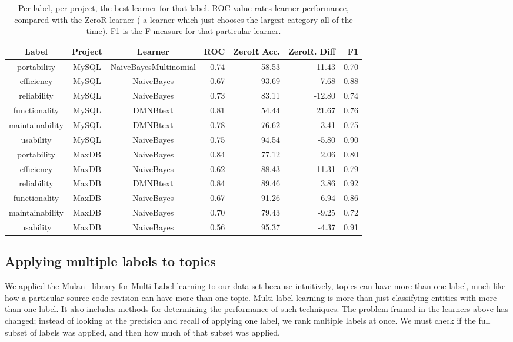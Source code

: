 \documentclass{acm_proc_article-sp}
\begin{document}
\begin{table}
\centering
\begin{tabular}{ccc|rrrr}
\toprule
Label & Project & Learner & ROC & ZeroR Acc. & ZeroR. Diff & F1\\
\midrule
portability &  MySQL &  NaiveBayesMultinomial &  0.74 &  58.53 &  11.43 &  0.70  \\ 
efficiency &  MySQL &  NaiveBayes &  0.67 &  93.69 &  -7.68 &  0.88 \\ 
reliability &  MySQL &  NaiveBayes &  0.73 &  83.11 &  -12.80 &  0.74 \\ 
functionality &  MySQL &  DMNBtext &  0.81 &  54.44 &  21.67 &  0.76 \\ 
maintainability &  MySQL &  DMNBtext &  0.78 &  76.62 &  3.41 &  0.75 \\ 
usability &  MySQL &  NaiveBayes &  0.75 &  94.54 &  -5.80 &  0.90  \\ 
 \hline 
portability &  MaxDB &  NaiveBayes &  0.84 &  77.12 &  2.06 &  0.80 \\ 
efficiency &  MaxDB &  NaiveBayes &  0.62 &  88.43 &  -11.31 &  0.79 \\ 
reliability &  MaxDB &  DMNBtext &  0.84 &  89.46 &  3.86 &  0.92  \\ 
functionality &  MaxDB &  NaiveBayes &  0.67 &  91.26 &  -6.94 &  0.86  \\ 
maintainability &  MaxDB &  NaiveBayes &  0.70 &  79.43 &  -9.25 &  0.72  \\ 
usability &  MaxDB &  NaiveBayes &  0.56 &  95.37 &  -4.37 &  0.91  \\ 
 \hline 
\end{tabular}
\caption{Per label, per project, the best learner for that label. ROC value rates learner performance, compared with the ZeroR learner ( a learner which just chooses the largest category all of the time). F1 is the F-measure for that particular learner.}
\label{tab:best-learn-per-tag}
\end{table}

\subsection{Applying multiple labels to topics}

We applied the Mulan~\cite{mulan} library for Multi-Label learning to our data-set because intuitively, topics can have more than one label, much like how a particular source code revision can have more than one topic. Multi-label learning is more than just classifying entities with more than one label. It also includes methods for determining the performance of such techniques. The problem framed in the learners above has changed; instead of looking at the precision and recall of applying one label, we rank multiple labels at once. We must check if the full subset of labels was applied, and then how much of that subset was applied.
\end{document}

